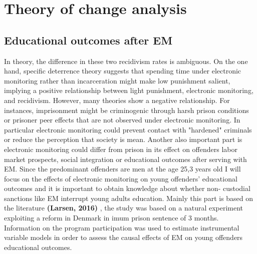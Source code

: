 \documentclass[a4paper,12pt]{article}
\begin{document}
\newpage
\section{Theory of change analysis}
\subsection{Educational outcomes after EM}
In theory, the difference in these two recidivism rates is ambiguous. On the one hand, specific deterrence theory suggests that spending time under electronic monitoring rather than incarceration might make low punishment salient, implying a positive relationship between light punishment, electronic monitoring, and recidivism. However, many theories show a negative relationship. For instances, imprisonment might be criminogenic through harsh prison conditions or prisoner peer effects that are not observed under electronic monitoring. In particular electronic monitoring could prevent contact with "hardened" criminals or reduce the perception that society is mean. Another also important part is electronic monitoring could differ from prison in its effect on offenders labor market prospects, social integration or educational outcomes after serving with EM. Since the predominant offenders are men at the age 25,3 years old I will focus on the effects of electronic monitoring on young offenders' educational outcomes and it is important to obtain knowledge about whether non- custodial sanctions like EM interrupt young adults education. Mainly this part is based on the literature \textbf{(Larsen, 2016)} \cite{Larsen2017}, the study was based on a natural experiment exploiting a reform in Denmark in imum prison sentence of 3 months. Information on the program participation was used to estimate instrumental variable models in order to assess the causal effects of EM on young offenders educational outcomes. 
\end{document}
